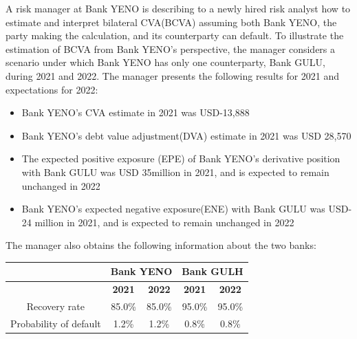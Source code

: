 \documentclass{article}
\newcounter{question} %
\begin{document}
\begin{question}
    A risk manager at Bank YENO is describing to a newly hired risk analyst how to estimate and interpret bilateral CVA(BCVA) assuming both Bank YENO, the party making the calculation, and its counterparty can default. To illustrate the estimation of BCVA from Bank YENO's perspective, the manager considers a scenario under which Bank YENO has only one counterparty, Bank GULU, during 2021 and 2022. The manager presents the following results for 2021 and expectations for 2022:
    \begin{itemize}
        \item Bank YENO's CVA estimate in 2021 was USD-13,888
        \item Bank YENO's debt value adjustment(DVA) estimate in 2021 was USD 28,570
        \item The expected positive exposure (EPE) of Bank YENO's derivative position with Bank GULU was USD 35million in 2021, and is expected to remain unchanged in 2022
        \item Bank YENO's expected negative exposure(ENE) with Bank GULU was USD-24 million in 2021, and is expected to remain unchanged in 2022
    \end{itemize}

    The manager also obtains the following information about the two banks:
    \begin{table}[H]
        \centering
        \renewcommand{\arraystretch}{1.2}
        \begin{tabular}{|c|c|c|c|c|}
            \hline
            & \multicolumn{2}{c|}{\textbf{Bank YENO}} & \multicolumn{2}{c|}{\textbf{Bank GULH}} \\
            \hline
            & \textbf{2021} & \textbf{2022} & \textbf{2021} & \textbf{2022} \\
            \hline
            Recovery rate & 85.0\% & 85.0\% & 95.0\% & 95.0\% \\
            \hline
            Probability of default & 1.2\% & 1.2\% & 0.8\% & 0.8\% \\
            \hline
        \end{tabular}
    \end{table}


\end{question}
\end{document}
